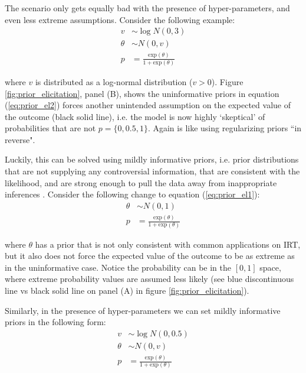 The scenario only gets equally bad with the presence of hyper-parameters, and even less extreme assumptions. Consider the following example:
%
\begin{equation} \label{eq:prior_el2}
	\begin{split}
		v &\sim \log N(0, 3) \\	
		\theta &\sim N(0, v) \\
		p &= \frac{ \text{exp}(\theta) }{ 1 + \text{exp}(\theta) }
	\end{split}
\end{equation}

\noindent where $v$ is distributed as a log-normal distribution ($v>0$). Figure \ref{fig:prior_elicitation}, panel (B), shows the uninformative priors in equation (\ref{eq:prior_el2}) forces another unintended assumption on the expected value of the outcome (black solid line), i.e. the model is now highly `skeptical' of probabilities that are not $p = \{0, 0.5, 1\}$. Again is like using regularizing priors ``in reverse".

Luckily, this can be solved using mildly informative priors, i.e. prior distributions that are not supplying any controversial information, that are consistent with the likelihood, and are strong enough to pull the data away from inappropriate inferences \cite{Gelman_et_al_2014}. Consider the following change to equation (\ref{eq:prior_el1}):
%
\begin{equation} \label{eq:prior_el3}
	\begin{split}	
		\theta &\sim N(0, 1) \\
		p &= \frac{ \text{exp}(\theta) }{ 1 + \text{exp}(\theta) }
	\end{split}
\end{equation}

\noindent where $\theta$ has a prior that is not only consistent with common applications on IRT, but it also does not force the expected value of the outcome to be as extreme as in the uninformative case. Notice the probability can be in the $[0,1]$ space, where extreme probability values are assumed less likely (see blue discontinuous line vs black solid line on panel (A) in figure \ref{fig:prior_elicitation}).

Similarly, in the presence of hyper-parameters we can set mildly informative priors in the following form:
%
\begin{equation} \label{eq:prior_el4}
	\begin{split}
		v &\sim \log N(0, 0.5) \\	
		\theta &\sim N(0, v) \\
		p &= \frac{ \text{exp}(\theta) }{ 1 + \text{exp}(\theta) }
	\end{split}
\end{equation}

